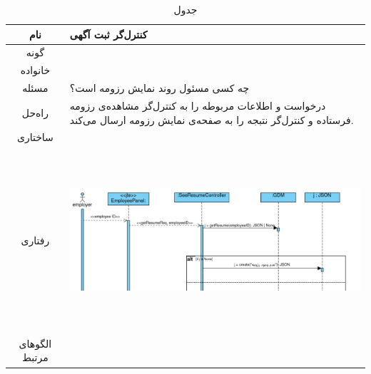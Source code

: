 \begin{table}[H]
	\begin{adjustbox}{width=\textwidth}
		\begin{tabular}{|c|p{\textwidth}|}
			\hline
			نام &
			کنترل‌گر ثبت آگهی \\ 
			\hline
			گونه & 
			\grasp \\
			\hline
			خانواده &
			\controller \\
			\hline
			مسئله & 
			چه کسی مسئول روند نمایش رزومه است؟\\
			\hline
			راه‌حل& 
			درخواست و اطلاعات مربوطه را به کنترل‌گر مشاهده‌ی رزومه فرستاده و کنترل‌گر نتبجه را به صفحه‌ی نمایش رزومه ارسال می‌کند. \\
			\hline
			ساختاری & 
			\\
			\hline
			رفتاری & 
			\begin{minipage}{\textwidth}
				\begin{flushleft}
					\begin{minipage}{\textwidth}
						\includegraphics[width=13.5cm, height=6cm]{./images/7-3-2}
					\end{minipage}
				\end{flushleft}
			\end{minipage}
			\\
			\hline
			الگو‌های مرتبط& \\
			\hline
		\end{tabular}
	\end{adjustbox}
	\caption{جدول }
	\label{table-with-pic:3}
\end{table}

